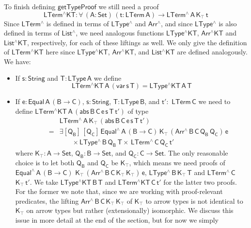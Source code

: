 \documentclass[sigplan,10pt]{acmart}
\begin{document}
To finish defining $\mathsf{getTypeProof}$ we still need a proof
\[ \mathsf{LTerm^\wedge KT : \forall\, (A : Set)\, (t : LTerm\, A) \to
  LTerm^{\wedge}\, A\, K_\top\,t} \] Since $\mathsf{LTerm^\wedge}$ is
defined in terms of $\mathsf{LType^\wedge}$ and $\mathsf{Arr^\wedge}$,
and since $\mathsf{LType^\wedge}$ is also defined in terms of
$\mathsf{List^\wedge}$, we need analogous functions
$\mathsf{LType^\wedge KT}$, $\mathsf{Arr^\wedge KT}$ and
$\mathsf{List^\wedge KT}$, respectively, for each of these liftings as
well.  We only give the definition of $\mathsf{LTerm^\wedge KT}$ here
since $\mathsf{LType^\wedge KT}$, $\mathsf{Arr^\wedge KT}$, and
$\mathsf{List^\wedge KT}$ are defined analogously. We have:
\begin{itemize}
\item If $\mathsf{s : String}$ and $\mathsf{T : LType\,A}$ we define
  \[\mathsf{LTerm^\wedge KT\,A\,(var\,s\,T)} = \mathsf{LType^\wedge
  KT\,A\,T}\]
\item If $\mathsf{e : Equal\,A\,(B \to C)}$, $\mathsf{s : String}$,
  $\mathsf{T : LType\,B}$, and $\mathsf{t' :}$ $\mathsf{LTerm\,C}$ we
  need to define $\mathsf{LTerm^\wedge KT\,A\, (abs\, B \,C \, e \,s
    \,T \, t')}$ of type
\[\begin{array}{ll}
 & \!\!\mathsf{LTerm^{\wedge}\,A\,K_\top\, (abs \,B \,C \,e \,s \,T
  \,t')}\\
\quad\quad = & \!\!\mathsf{\exists [Q_B]\, [Q_C]\, Equal^{\wedge} \, A\, (B \to
  C)\, K_\top\, (Arr^{\wedge} \, B\, C\, Q_B \, Q_C)\, e }\\
 & \quad\quad\mathsf{\times \, LType^{\wedge}\, B\, Q_B\, T \times \,
  LTerm^{\wedge}\, C\, Q_C\,t' }
\end{array}\]
where $\mathsf{K_\top : A \to Set}$, $\mathsf{Q_B : B \to Set}$, and
$\mathsf{Q_C : C \to Set}$.  The only reasonable choice is to let both
$\mathsf{Q_B}$ and $\mathsf{Q_C}$ be $\mathsf{K_\top}$, which means we
need proofs of
$\mathsf{Equal^{\wedge} \, A\, (B \to C)}$ $\mathsf{K_\top\,
  (Arr^{\wedge} \, B\, C\, K_\top \, K_\top)\, e}$,
$\mathsf{LType^{\wedge}\, B\, K_\top\, T}$ and
$\mathsf{LTerm^{\wedge}\, C}$ $\mathsf{K_\top\, t'}$.  We take
$\mathsf{LType^\wedge KT\, B\, T}$ and $\mathsf{LTerm^\wedge KT\, C\,
  t'}$ for the latter two proofs. For the former we note that, since
we are working with proof-relevant predicates, the lifting
$\mathsf{Arr^{\wedge} \, B\, C\, K_\top \, K_\top}$ of
$\mathsf{K_\top}$ to arrow types is not identical to $\mathsf{K_\top}$
on arrow types but rather (extensionally) isomorphic.  We discuss this
issue in more detail at the end of the section, but for now we simply

\end{itemize}
\end{document}
